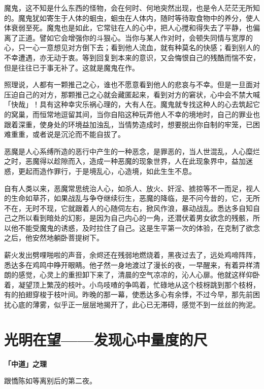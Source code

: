 \documentclass[twoside,openany]{book}
\newcommand{\mt}[1]{\textbullet \textbf{#1}}
\begin{document}
魔鬼，这不知是什么东西的怪物，会在何时、何地突然出现，也是令人茫茫无所知的。魔鬼犹如寄生于人体的蛔虫，蛔虫在人体内，随时等待取食物中的养分，使人体衰弱至死。魔鬼也是如此，它常驻在人的心中，把人心搅和得失去了平静，也偏离了正道。譬如它会增强你的斗狠心。当你与某人作对时，会顿失同情与宽厚的心，只一心一意想见对方倒下去；看到他人流血，就有种莫名的快感；看到别人的不幸遭遇，亦无动于衷。等到回复到本来的意识，又会悔恨自己的残酷而惴不安，但是往往已于事无补了。这就是魔鬼在作。

照理说，人都有一颗推己之心，谁也不愿意看到他人的悲哀与不幸。但是一旦面对压迫自己的对方，那颗推己之心就会藏匿起来，看到对方的窘状，心中会不禁大喊「快哉」！具有这种幸灾乐祸心理的，大有人在。魔鬼就专找这种人的心去筑起它的窝巢，而恒常地逗留其间，当你自陷这种玩弄他人不幸的境地时，自己的罪业也跟着深重，使身处的环境益加浊乱，当情势造成时，想要脱出你自制的牢笼，已困难重重，或者说是沉沦而不能自拔了。

恶魔是人心系缚所造的恶行中产生的一种恶念，是罪恶的，当人世混乱，人心糜烂之时，恶魔得以趁隙而入，造成一种恶魔的现象世界，人在此现象界中，益加迷惑，更起而造作罪行，于是境乱心，心造境，如此生生不息。

自有人类以来，恶魔常思统治人心，如杀人、放火、奸淫、掳掠等不一而足，视人的生命如草芥，如果战乱与争夺继续衍生，恶魔的降临，是不问今昔的，它，无所不在，无时不现，它就跟着人的心随伺左右，掀风作浪，暴动战乱。悉达多自知自己之所以看到暗处的幻影，是因为自己内心的一角，还潜伏着男女欲念的残骸，所以他不能受魔鬼的诱惑，及时拉住了自己。这是生平第一次的体验，在克制了欲念之后，他安然地躺卧菩提树下。

薪火发出劈哩啪啦的声音，余烬还在残弱地燃烧着，黑夜过去了，远处鸡啼阵阵，悉达多在鸡鸣中睁开眼睛。他孑然一身地渡过了漫长的夜，一早醒来，有着异样清朗的感觉，心灵上的重担卸下来了，清晨的空气凉凉的，沁人心扉。他就这样仰卧着，凝望顶上繁茂的枝叶。小鸟吱喳的争鸣着，忙碌地从这个枝枒跳到那个枝枒，有的拍翅穿梭于枝叶间。昨晚的那一幕，使悉达多心有余悸，不过今早，那先前困扰心底的薄雾，似乎正一层层地揭开了，此心已无滞碍，感觉不到一丝丝的拘泥。

\section{光明在望——发现心中量度的尺}\label{sec1.11}

\mt{「中道」之理}

跟憍陈如等离别后的第二夜。
\end{document}
